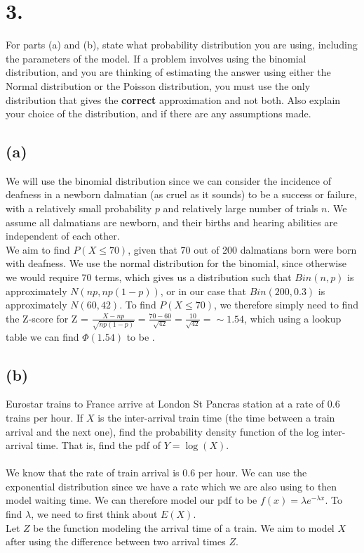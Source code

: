 \documentclass{article}
\begin{document}
\section*{3.}
{\Large

For parts (a) and (b), state what probability distribution you are using, including the parameters of the model.
If  a problem involves using the binomial distribution, and you are thinking of estimating the answer using either the Normal distribution or the Poisson distribution, you must use the only distribution that gives the {\bf{correct}} approximation and not both. Also explain your choice of the distribution, and if there are any assumptions made. 

\subsection*{(a)}
We will use the binomial distribution since we can consider the incidence of deafness in a newborn dalmatian (as cruel as it sounds) to be a success or failure, with a relatively small probability $p$ and relatively large number of trials $n$. We assume all dalmatians are newborn, and their births and hearing abilities are independent of each other. \\
We aim to find $P(X \leq 70)$, given that 70 out of 200 dalmatians born were born with deafness. We use the normal distribution for the binomial, since otherwise we would require 70 terms, which gives us a distribution such that $Bin(n,p)$ is approximately $N(np, np(1-p))$, or in our case that $Bin(200, 0.3)$ is approximately $N(60, 42)$. To find $P(X \leq 70)$, we therefore simply need to find the Z-score for Z = $\frac{X - np}{\sqrt{np(1-p)}} = \frac{70-60}{\sqrt{42}} = \frac{10}{\sqrt{42}} = \sim 1.54$, which using a lookup table we can find $\Phi(1.54)$ to be .

\subsection*{(b)}
Eurostar trains to France arrive at London St Pancras station at a rate of $0.6$ trains per  hour. If $X$ is the inter-arrival train time (the time between a train arrival and the next one), find the probability density function of the log inter-arrival time. That is, find the pdf of $Y=\log(X).$ \\ \\
We know that the rate of train arrival is 0.6 per hour. We can use the exponential distribution since we have a rate which we are also using to then model waiting time. We can therefore model our pdf to be $f(x) = \lambda e^{-\lambda x}$. To find $\lambda$, we need to first think about $E(X)$. \\ 
Let $Z$ be the function modeling the arrival time of a train. We aim to model $X$ after using the difference between two arrival times $Z$. 

}
\end{document}
